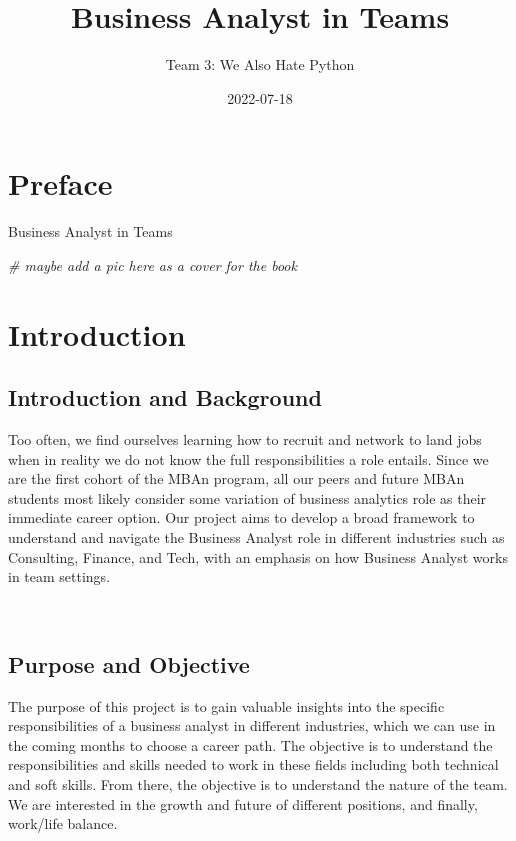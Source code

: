 \documentclass[
]{book}
\title{Business Analyst in Teams}
\author{Team 3: We Also Hate Python}
\date{2022-07-18}
\newenvironment{Shaded}{\begin{snugshade}}{\end{snugshade}}
\newcommand{\CommentTok}[1]{\textcolor[rgb]{0.56,0.35,0.01}{\textit{#1}}}
\begin{document}
\maketitle

{
\setcounter{tocdepth}{1}
\tableofcontents
}
\hypertarget{preface}{%
\chapter{Preface}\label{preface}}

Business Analyst in Teams

\begin{Shaded}
\begin{Highlighting}[]
\CommentTok{\# maybe add a pic here as a cover for the book}
\end{Highlighting}
\end{Shaded}

\hypertarget{introduction}{%
\chapter{Introduction}\label{introduction}}

\hypertarget{introduction-and-background}{%
\section{\texorpdfstring{\textbf{Introduction and Background}}{Introduction and Background}}\label{introduction-and-background}}

Too often, we find ourselves learning how to recruit and network to land jobs when in reality we do not know the full responsibilities a role entails. Since we are the first cohort of the MBAn program, all our peers and future MBAn students most likely consider some variation of business analytics role as their immediate career option. Our project aims to develop a broad framework to understand and navigate the Business Analyst role in different industries such as Consulting, Finance, and Tech, with an emphasis on how Business Analyst works in team settings.

~

\hypertarget{purpose-and-objective}{%
\section{\texorpdfstring{\textbf{Purpose and Objective}}{Purpose and Objective}}\label{purpose-and-objective}}

The purpose of this project is to gain valuable insights into the specific responsibilities of a business analyst in different industries, which we can use in the coming months to choose a career path. The objective is to understand the responsibilities and skills needed to work in these fields including both technical and soft skills. From there, the objective is to understand the nature of the team. We are interested in the growth and future of different positions, and finally, work/life balance.
\end{document}
